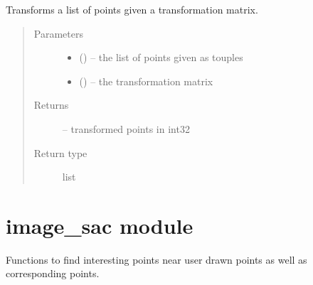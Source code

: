 \documentclass[letterpaper,10pt,english]{sphinxmanual}
\begin{document}

\begin{fulllineitems}
\label{\detokenize{image_perspective_alignment:image_perspective_alignment.transform_points}}
Transforms a list of points given a transformation matrix.
\begin{quote}\begin{description}
\item[{Parameters}] \leavevmode\begin{itemize}
\item {} 
 () -- the list of points given as touples

\item {} 
 () -- the transformation matrix

\end{itemize}

\item[{Returns}] \leavevmode
{} -- transformed points in int32

\item[{Return type}] \leavevmode
list

\end{description}\end{quote}

\end{fulllineitems}



\chapter{image\_sac module}
\label{\detokenize{image_sac:image-sac-module}}\label{\detokenize{image_sac::doc}}\label{\detokenize{image_sac:module-image_sac}}
Functions to find interesting points near user drawn points as well as
corresponding points.
\end{document}
